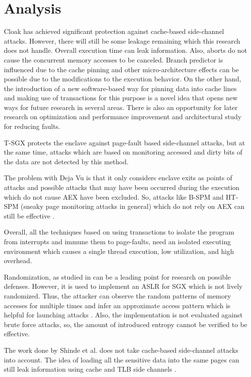 \section{Analysis}
Cloak \cite{cloak} has achieved significant protection against cache-based side-channel attacks. However, there will still be some leakage remaining which this research does not handle. Overall execution time can leak information. Also, aborts do not cause the concurrent memory accesses to be canceled. Branch predictor is influenced due to the cache pinning and other micro-architecture effects can be possible due to the modifications to the execution behavior. On the other hand, the introduction of a new software-based way for pinning data into cache lines and making use of transactions for this purpose is a novel idea that opens new ways for future research in several areas. There is also an opportunity for later research on optimization and performance improvement and architectural study for reducing faults.

T-SGX \cite{tsgx} protects the enclave against page-fault based side-channel attacks, but at the same time, attacks which are based on monitoring accessed and dirty bits of the data are not detected by this method.

The problem with Deja Vu \cite{dejavu} is that it only considers enclave exits as points of attacks and possible attacks that may have been occurred during the execution which do not cause AEX have been excluded. So, attacks like B-SPM and HT-SPM (sneaky page monitoring attacks in general) which do not rely on AEX can still be effective \cite{leakycauldron}.

Overall, all the techniques based on using transactions to isolate the program from interrupts and immune them to page-faults, need an isolated executing environment which causes a single thread execution, low utilization, and high overhead.

Randomization, as studied in \cite{sgxshield} can be a leading point for research on possible defenses. However, it is used to implement an ASLR for SGX which is not lively randomized. Thus, the attacker can observe the random patterns of memory accesses for multiple times and infer an approximate access pattern which is helpful for launching attacks \cite{leakycauldron}. Also, the implementation is not evaluated against brute force attacks, so, the amount of introduced entropy cannot be verified to be effective.

The work done by Shinde et al. \cite{pigeonhole} does not take cache-based side-channel attacks into account. The idea of loading all the sensitive data into the same pages can still leak information using cache and TLB side channels \cite{leakycauldron}.


